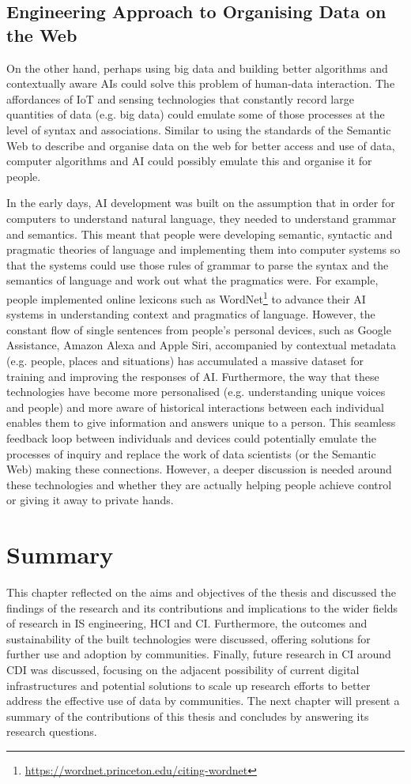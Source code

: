 \subsection{Engineering Approach to Organising Data on the Web}
On the other hand, perhaps using big data and building better algorithms and contextually aware AIs could solve this problem of human-data interaction. The affordances of IoT and sensing technologies that constantly record large quantities of data (e.g. big data) could emulate some of those processes at the level of syntax and associations. Similar to using the standards of the Semantic Web to describe and organise data on the web for better access and use of data, computer algorithms and AI could possibly emulate this and organise it for people.

In the early days, AI development was built on the assumption that in order for computers to understand natural language, they needed to understand grammar and semantics. This meant that people were developing semantic, syntactic and pragmatic theories of language and implementing them into computer systems so that the systems could use those rules of grammar to parse the syntax and the semantics of language and work out what the pragmatics were. For example, people implemented online lexicons such as WordNet\footnote{\url{https://wordnet.princeton.edu/citing-wordnet}} to advance their AI systems in understanding context and pragmatics of language. However, the constant flow of single sentences from people's personal devices, such as Google Assistance, Amazon Alexa and Apple Siri, accompanied by contextual metadata (e.g. people, places and situations) has accumulated a massive dataset for training and improving the responses of AI. Furthermore, the way that these technologies have become more personalised (e.g. understanding unique voices and people) and more aware of historical interactions between each individual enables them to give information and answers unique to a person. This seamless feedback loop between individuals and devices could potentially emulate the processes of inquiry and replace the work of data scientists (or the Semantic Web) making these connections. However, a deeper discussion is needed around these technologies and whether they are actually helping people achieve control or giving it away to private hands.

\section{Summary}
This chapter reflected on the aims and objectives of the thesis and discussed the findings of the research and its contributions and implications to the wider fields of research in IS engineering, HCI and CI. Furthermore, the outcomes and sustainability of the built technologies were discussed, offering solutions for further use and adoption by communities. Finally, future research in CI around CDI was discussed, focusing on the adjacent possibility of current digital infrastructures and potential solutions to scale up research efforts to better address the effective use of data by communities. The next chapter will present a summary of the contributions of this thesis and concludes by answering its research questions.